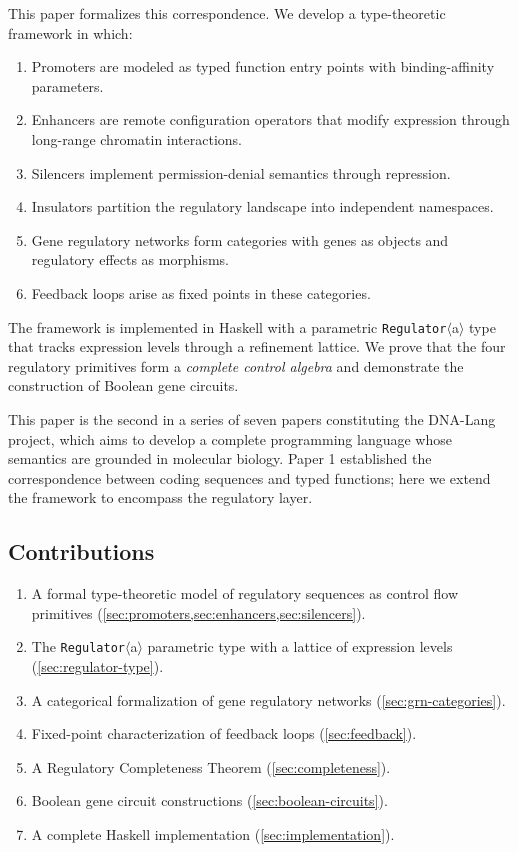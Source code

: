 \documentclass[12pt,a4paper]{article}
\newcommand{\Reg}[1]{\texttt{Regulator}\ensuremath{\langle}#1\ensuremath{\rangle}}
\begin{document}
This paper formalizes this correspondence.  We develop a type-theoretic framework in which:
\begin{enumerate}[label=(\roman*)]
  \item Promoters are modeled as typed function entry points with binding-affinity parameters.
  \item Enhancers are remote configuration operators that modify expression through long-range chromatin interactions.
  \item Silencers implement permission-denial semantics through repression.
  \item Insulators partition the regulatory landscape into independent namespaces.
  \item Gene regulatory networks form categories with genes as objects and regulatory effects as morphisms.
  \item Feedback loops arise as fixed points in these categories.
\end{enumerate}

The framework is implemented in Haskell with a parametric \Reg{a} type that tracks expression levels through a refinement lattice.  We prove that the four regulatory primitives form a \emph{complete control algebra} and demonstrate the construction of Boolean gene circuits.

This paper is the second in a series of seven papers constituting the DNA-Lang project, which aims to develop a complete programming language whose semantics are grounded in molecular biology.  Paper 1 established the correspondence between coding sequences and typed functions; here we extend the framework to encompass the regulatory layer.

\subsection{Contributions}

\begin{enumerate}
  \item A formal type-theoretic model of regulatory sequences as control flow primitives (\cref{sec:promoters,sec:enhancers,sec:silencers}).
  \item The \Reg{a} parametric type with a lattice of expression levels (\cref{sec:regulator-type}).
  \item A categorical formalization of gene regulatory networks (\cref{sec:grn-categories}).
  \item Fixed-point characterization of feedback loops (\cref{sec:feedback}).
  \item A Regulatory Completeness Theorem (\cref{sec:completeness}).
  \item Boolean gene circuit constructions (\cref{sec:boolean-circuits}).
  \item A complete Haskell implementation (\cref{sec:implementation}).
\end{enumerate}
\end{document}
